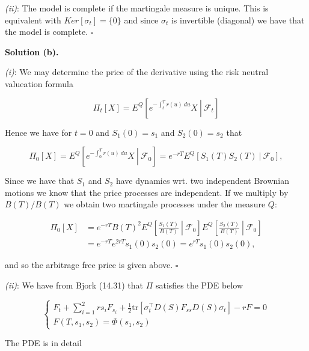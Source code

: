 \documentclass[
]{book}
\begin{document}
\emph{(ii)}: The model is complete if the martingale measure is unique. This is equivalent with \(Ker[\sigma_t]=\{0\}\) and since \(\sigma_t\) is invertible (diagonal) we have that the model is complete. \(\square\)

\noindent\makebox[\linewidth]{\rule{\textwidth}{0.4pt}}

\textbf{Solution (b).}

\emph{(i)}: We may determine the price of the derivative using the risk neutral valueation formula

\[
\Pi_t[X]=E^Q\left[\left.e^{-\int_t^Tr(u)\ du}X\ \right\vert\ \mathcal{F}_t\right]
\]

Hence we have for \(t=0\) and \(S_1(0)=s_1\) and \(S_2(0)=s_2\) that

\[
\Pi_0[X]=E^Q\left[\left.e^{-\int_0^Tr(u)\ du}X\ \right\vert\ \mathcal{F}_0\right]=e^{-rT}E^Q\left[\left. S_1(T)S_2(T)\ \right\vert\ \mathcal{F}_0\right],
\]

Since we have that \(S_1\) and \(S_2\) have dynamics wrt. two independent Brownian motions we know that the price processes are independent. If we multiply by \(B(T)/B(T)\) we obtain two martingale processes under the measure \(Q\):

\begin{align*}
\Pi_0[X]&=e^{-rT}B(T)^2E^Q\left[\left. \frac{S_1(T)}{B(T)}\ \right\vert\ \mathcal{F}_0\right]E^Q\left[\left. \frac{S_2(T)}{B(T)}\ \right\vert\ \mathcal{F}_0\right]\\
&=e^{-rT}e^{2rT}s_1(0)s_2(0)=e^{rT}s_1(0)s_2(0),
\end{align*}

and so the arbitrage free price is given above. \(\square\)

\emph{(ii)}: We have from Bjork (14.31) that \(\Pi\) satisfies the PDE below

\[
\begin{cases}
F_t+\sum_{i=1}^2rs_iF_{s_i}+\frac{1}{2}\text{tr}[\sigma_t^\top D(S)F_{ss}D(S)\sigma_t]-rF=0\\
F(T,s_1,s_2)=\Phi(s_1,s_2)
\end{cases}
\]

The PDE is in detail
\end{document}
